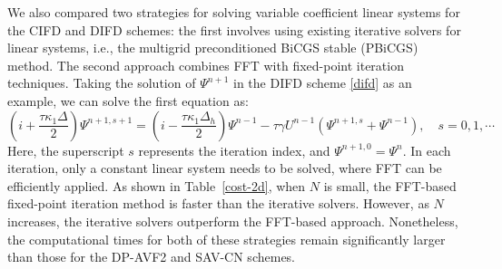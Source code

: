 \documentclass[fleqn,11pt]{elsarticle}
\numberwithin{equation}{section}
\begin{document}
\begin{table}[H]
	\caption{The CPU time of the proposed different schemes under different spatial grid sizes.}\label{tab:cpu_time_diff_methods2d}\label{cost-2d}
	\centering
\end{table}





We also compared two strategies for solving variable coefficient linear systems for the CIFD and DIFD schemes: the first involves using existing iterative solvers for linear systems, i.e., the multigrid preconditioned BiCGS stable (PBiCGS) method. The second approach combines FFT with fixed-point iteration techniques. Taking the solution of $ \Psi^{n+1} $ in the DIFD scheme \eqref{difd} as an example, we can solve the first equation as:
\[
\left( i + \frac{\tau \kappa_1 \Delta}{2} \right) \Psi^{n+1,s+1} = \left( i - \frac{\tau \kappa_1 \Delta_h}{2} \right) \Psi^{n-1} - \tau \gamma U^{n-1} (\Psi^{n+1,s} + \Psi^{n-1}), \quad s = 0, 1, \cdots
\]
Here, the superscript $ s $ represents the iteration index, and $ \Psi^{n+1,0} = \Psi^n $. In each iteration, only a constant linear system needs to be solved, where FFT can be efficiently applied. As shown in Table~\ref{cost-2d}, when $ N $ is small, the FFT-based fixed-point iteration method is faster than the iterative solvers. However, as $ N $ increases, the iterative solvers outperform the FFT-based approach. Nonetheless, the computational times for both of these strategies remain significantly larger than those for the DP-AVF2 and SAV-CN schemes.
\end{document}
